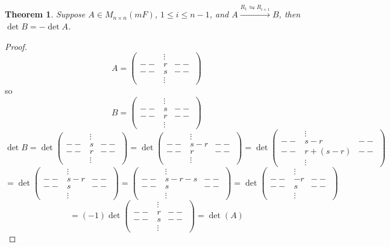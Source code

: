 \documentclass[12pt]{article}
\newtheorem{theorem}{Theorem}[subsection]
\begin{document}
\begin{theorem}
	Suppose $A \in M_{n\times n} (mF)$,  $1 \leq i\leq n-1$, and 
	$A \overset{R_1 \leftrightharpoons R_{i+1}}{\longrightarrow} B$, then
	$\det B = - \det A$. 
\end{theorem}
\begin{proof}
	\[
		A = 
		\begin{pmatrix}
				& \vdots&	\\
			-- & r		&--\\
			-- & s		&--\\
				& \vdots&
		\end{pmatrix}
	\]
	so 
	\[
		B = 
		\begin{pmatrix}
				& \vdots&	\\
			-- & s		&--\\
			-- & r		&--\\
				& \vdots&
		\end{pmatrix}
	\]
	\[
		\det B = \det \begin{pmatrix}
				& \vdots&	\\
			-- & s		&--\\
			-- & r		&--\\
				& \vdots&
		\end{pmatrix}
		= \det \begin{pmatrix}
				& \vdots&	\\
			-- & s - r		&--\\
			-- & r		&--\\
				& \vdots&
		\end{pmatrix}
		= \det \begin{pmatrix}
				& \vdots&	\\
			-- & s-r		&--\\
			-- & r+(s-r)	&--\\
				& \vdots&
		\end{pmatrix}
		\]\[
		= \det \begin{pmatrix}
				& \vdots&	\\
			-- & s-r		&--\\
			-- & s		&--\\
				& \vdots&
		\end{pmatrix}
		= \begin{pmatrix}
				& \vdots&	\\
			-- & s-r-s		&--\\
			-- & s		&--\\
				& \vdots&
		\end{pmatrix}
		= \det\begin{pmatrix}
				& \vdots&	\\
			-- & -r		&--\\
			-- & s		&--\\
				& \vdots&
		\end{pmatrix}\]\[
		= (-1) \det\begin{pmatrix}
				& \vdots&	\\
			-- & r		&--\\
			-- & s		&--\\
				& \vdots&
		\end{pmatrix}
		= \det (A)
	\]
\end{proof}
\end{document}
